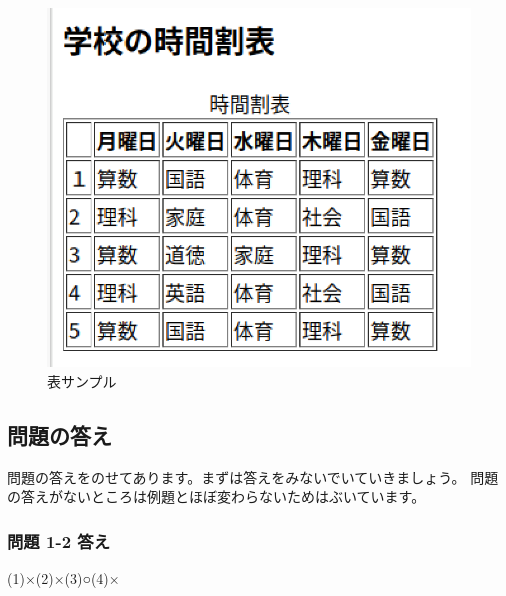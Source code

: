 \begin{figure}[h]
  \centering
  \begin{minipage}{0.43\textwidth}
    {\upshape
      \includegraphics[width=\linewidth]{text01-img/textbook-img211.png}
      \caption{表サンプル}\label{fig:50}
    }
  \end{minipage}  
\end{figure}

\clearpage
\subsection{\bfseries 問題の答え}

問題の答えをのせてあります。まずは答えをみないでいていきましょう。\newline
問題の答えがないところは例題とほぼ変わらないためはぶいています。

\subsubsection{\bfseries 問題 1-2 答え}

  (1)×\hspace{2em}(2)×\hspace{2em}(3)○\hspace{2em}(4)×

